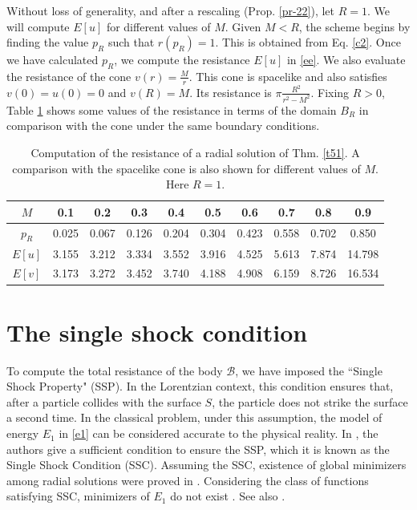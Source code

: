 \documentclass[a4paper,12pt]{amsart}
\theoremstyle{definition}
\begin{document}
Without loss of generality, and after a rescaling (Prop. \ref{pr-22}), let $R=1$. We will compute $E[u]$ for different values of $M$. Given $M<R$, the scheme begins by finding the value $p_R$ such that  $r(p_R)=1$. This is obtained from Eq. \eqref{c2}. Once we have calculated $p_R$, we compute the resistance $E[u]$ in \eqref{ee}. We also evaluate the resistance of the cone
 $v(r)=\frac{M}{r}$. This cone is spacelike and also satisfies $v(0) =u(0)=0$ and $v(R) =M$. Its resistance is $\pi \frac{R^2}{r^2-M^2}$.  Fixing $R>0$, Table \ref{table1}  shows some values of the resistance in terms of the domain $B_R$ in comparison with the cone under the same boundary conditions.

\begin{table}[h!]
\centering
\begin{tabular}{|c|c|c|c|c|c|c|c|c|c|}
\hline
$M $& 0.1 & 0.2 & 0.3 & 0.4 & 0.5 & 0.6 & 0.7 & 0.8 & 0.9 \\ \hline
$p_R$ & 0.025 & 0.067 & 0.126 & 0.204 & 0.304 & 0.423 & 0.558 & 0.702 & 0.850 \\ \hline
$E[u]$ & 3.155 & 3.212 & 3.334 & 3.552 & 3.916 & 4.525 & 5.613 & 7.874 & 14.798 \\ \hline
$E[v]$& 3.173&3.272 & 3.452& 3.740 & 4.188&4.908 & 6.159&8.726 & 16.534 \\ \hline
\end{tabular}\vspace{0.2cm}
\caption{Computation of the resistance of a radial solution of Thm. \ref{t51}. A comparison with the spacelike cone is also shown for different values of $M$.   Here $R=1$. }\label{table1}
\end{table}
 
\section{The single shock condition}\label{s6}

To compute the total resistance of the body $\mathcal{B}$, we have imposed the ``Single Shock Property" (SSP). In the Lorentzian context, this condition ensures that, after a particle collides with the surface $S$, the particle does not strike the surface a second time. In the classical problem, under this assumption, the model of energy $E_1$ in \eqref{e1} can be considered accurate to the physical reality. In \cite{bfk}, the authors give a sufficient condition to ensure the SSP, which it is known as the Single Shock Condition (SSC). Assuming the SSC, existence of global minimizers among radial solutions were proved in \cite{cl,cl2}. Considering the class of functions satisfying SSC, minimizers of $E_1$ do not exist \cite{pa0,pa1}.  See also   \cite{ak,lw}.
\end{document}
